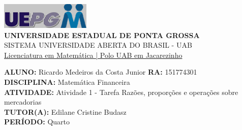 \documentclass[a4paper, 12pt]{article}
\begin{document}
\begin{flushleft}\includegraphics{logo}\\
\textbf{UNIVERSIDADE ESTADUAL DE PONTA GROSSA} \\
SISTEMA UNIVERSIDADE ABERTA DO BRASIL - UAB \\
\underline{Licenciatura em Matemática | Polo UAB em Jacarezinho}\end{flushleft} 
\textbf{ALUNO:} Ricardo Medeiros da Costa Junior   \textbf{RA:} 151774301 \\
\textbf{DISCIPLINA:} Matemática Financeira \\
\textbf{ATIVIDADE:} Atividade 1 - Tarefa Razões, proporções e operações sobre mercadorias \\ 
\textbf{TUTOR(A):} Edilane Cristine Budasz \\
\textbf{PERÍODO:} Quarto \\
\end{document}
